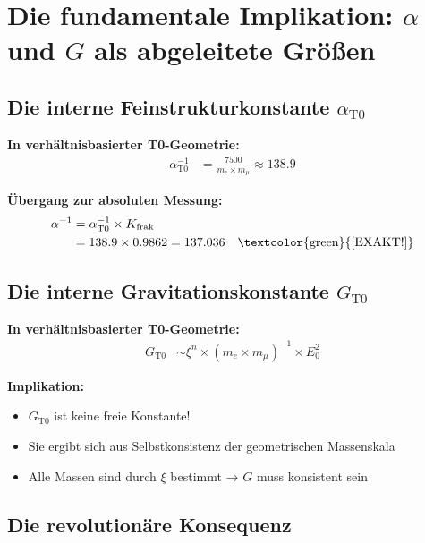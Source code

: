 	\section{Die fundamentale Implikation: $\alpha$ und $G$ als abgeleitete Größen}
	
	\subsection{Die interne Feinstrukturkonstante $\alpha_{\text{T0}}$}
	
	\textbf{In verhältnisbasierter T0-Geometrie:}
	\begin{align*}
		\alpha_{\text{T0}}^{-1} &= \frac{7500}{m_e \times m_μ} \approx 138.9
	\end{align*}
	
	\textbf{Übergang zur absoluten Messung:}
	\begin{align*}
		\alpha^{-1} &= \alpha_{\text{T0}}^{-1} \times K_{\text{frak}} \\
		&= 138.9 \times 0.9862 = 137.036 \quad \text{\textcolor{green}{[EXAKT!]}}
	\end{align*}
	
	\subsection{Die interne Gravitationskonstante $G_{\text{T0}}$}
	
	\textbf{In verhältnisbasierter T0-Geometrie:}
	\begin{align*}
		G_{\text{T0}} &\sim \xi^n \times (m_e \times m_μ)^{-1} \times E_0^2
	\end{align*}
	
	\textbf{Implikation:}
	\begin{itemize}
		\item $G_{\text{T0}}$ ist keine freie Konstante!
		\item Sie ergibt sich aus Selbstkonsistenz der geometrischen Massenskala
		\item Alle Massen sind durch $\xi$ bestimmt → $G$ muss konsistent sein
	\end{itemize}
	
	\subsection{Die revolutionäre Konsequenz}
	
	\begin{center}
	\end{center}
	
